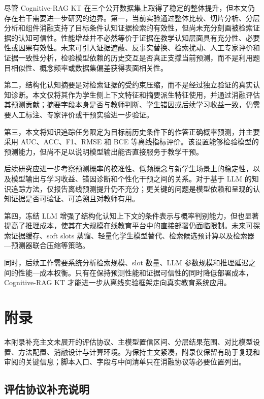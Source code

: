 \documentclass[UTF8,a4paper,12pt]{ctexart}
\numberwithin{table}{section}
\begin{document}
尽管 Cognitive-RAG KT 在三个公开数据集上取得了稳定的整体提升，但本文仍存在若干需要进一步研究的边界。第一，当前实验通过整体比较、切片分析、分层分析和组件消融支持了目标条件认知证据检索的有效性，但尚未充分刻画被检索证据的认知可信性。性能增益并不必然等价于证据在教学认知层面具有充分性、必要性或因果有效性。未来可引入证据遮蔽、反事实替换、检索扰动、人工专家评价和证据一致性分析，检验模型依赖的历史交互是否真正支撑当前预测，而不是利用题目相似性、概念频率或数据集偏差获得表面相关性。

第二，结构化认知摘要是对检索证据的受约束压缩，而不是经过独立验证的真实认知诊断。本文仅将其作为学生侧上下文特征和摘要派生特征使用，并通过消融评估其预测贡献；摘要字段本身是否与教师判断、学生错因或后续学习收益一致，仍需要人工标注、专家评价或干预实验进一步验证。

第三，本文将知识追踪任务限定为目标前历史条件下的作答正确概率预测，并主要采用 AUC、ACC、F1、RMSE 和 BCE 等离线指标评价。该设置能够检验模型的预测能力，但尚不足以说明模型输出能否直接服务于教学干预。

后续研究应进一步考察预测概率的校准性、低频概念与新学生场景上的稳定性，以及模型输出与学习收益、错因诊断和个性化干预之间的关系。对于基于 LLM 的知识追踪方法，仅报告离线预测提升仍不充分；更关键的问题是模型依赖和呈现的认知证据是否可验证、可追溯且对教师有用。

第四，冻结 LLM 增强了结构化认知上下文的条件表示与概率判别能力，但也显著提高了推理成本，使其在大规模在线教育平台中的直接部署仍面临限制。未来可探索证据缓存、soft slots 蒸馏、轻量化学生模型替代、检索候选预计算以及检索器—预测器联合压缩等策略。

同时，后续工作需要系统分析检索规模、slot 数量、LLM 参数规模和推理延迟之间的性能—成本权衡。只有在保持预测性能和证据可信性的同时降低部署成本，Cognitive-RAG KT 才能进一步从离线实验框架走向真实教育系统应用。





\clearpage



\clearpage
\appendix
\section{附录}
\label{app:experiment-details}

本附录补充主文未展开的评估协议、主模型置信区间、分层结果范围、对比模型设置、方法配置、消融设计与计算环境。为保持主文紧凑，附录仅保留有助于复现和审阅的关键信息；脚本入口、字段与中间清单只在消融协议等必要位置列出。

\subsection{评估协议补充说明}
\end{document}
